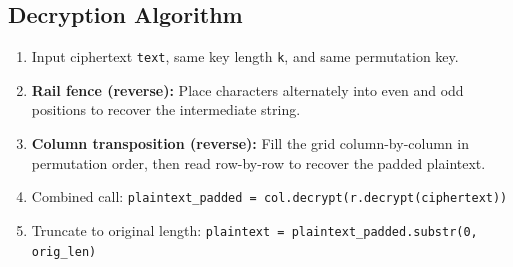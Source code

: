 \subsection*{Decryption Algorithm}
\begin{enumerate}
  \item Input ciphertext \texttt{text}, same key length \texttt{k}, and same permutation key.
  \item \textbf{Rail fence (reverse):} Place characters alternately into even and odd positions to recover the intermediate string.
  \item \textbf{Column transposition (reverse):} Fill the grid column-by-column in permutation order, then read row-by-row to recover the padded plaintext.
  \item Combined call: \texttt{plaintext\_padded = col.decrypt(r.decrypt(ciphertext))}
  \item Truncate to original length: \texttt{plaintext = plaintext\_padded.substr(0, orig\_len)}
\end{enumerate}





